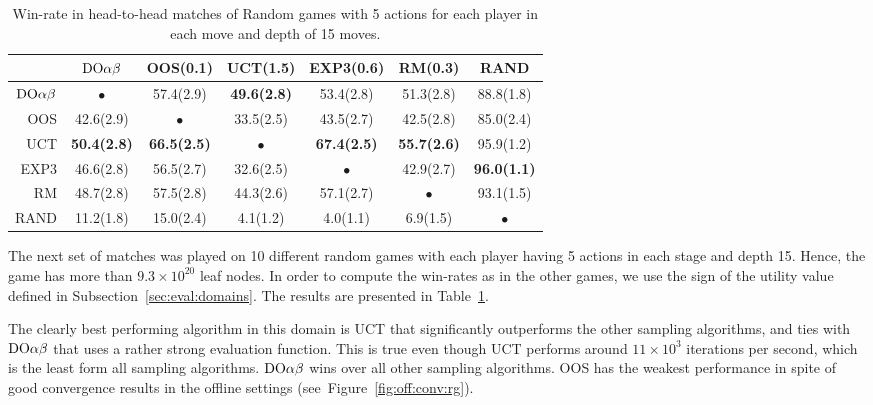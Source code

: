 \begin{table}
\centering
\begin{scriptsize}

\begin{tabular}{|r|cccccc|}\hline
&$\textrm{DO}\alpha\beta$&OOS(0.1)&UCT(1.5)&EXP3(0.6)&RM(0.3)&RAND\\\hline
$\textrm{DO}\alpha\beta$&$\bullet$&57.4(2.9)&\textbf{49.6(2.8)}&53.4(2.8)&51.3(2.8)&88.8(1.8)\\
OOS&42.6(2.9)&$\bullet$&33.5(2.5)&43.5(2.7)&42.5(2.8)&85.0(2.4)\\
UCT&\textbf{50.4(2.8)}&\textbf{66.5(2.5)}&$\bullet$&\textbf{67.4(2.5)}&\textbf{55.7(2.6)}&95.9(1.2)\\
EXP3&46.6(2.8)&56.5(2.7)&32.6(2.5)&$\bullet$&42.9(2.7)&\textbf{96.0(1.1)}\\
RM&48.7(2.8)&57.5(2.8)&44.3(2.6)&57.1(2.7)&$\bullet$&93.1(1.5)\\
RAND&11.2(1.8)&15.0(2.4)&4.1(1.2)&4.0(1.1)&6.9(1.5)&$\bullet$\\
\hline
\end{tabular}

\end{scriptsize}
\caption{Win-rate in head-to-head matches of Random games with 5 actions for each player in each move and depth of 15 moves.}\label{fig:matches:rand}
\end{table}


The next set of matches was played on 10 different random games with each player having 5 actions in each stage and depth 15. Hence, the game has more than $9.3\times 10^{20}$ leaf nodes. In order to compute the win-rates as in the other games, we use the sign of the utility value defined in Subsection~\ref{sec:eval:domains}. The results are presented in Table~\ref{fig:matches:rand}.

The clearly best performing algorithm in this domain is UCT that significantly outperforms the other sampling algorithms, and ties with $\textrm{DO}\alpha\beta$ that uses a rather strong evaluation function.
This is true even though UCT performs around $11 \times 10^3$ iterations per second, which is the least form all sampling algorithms.
$\textrm{DO}\alpha\beta$ wins over all other sampling algorithms.
OOS has the weakest performance in spite of good convergence results in the offline settings (see~Figure~\ref{fig:off:conv:rg}).

